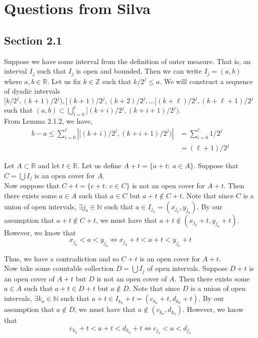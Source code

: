 \documentclass[12pt]{article}
\newenvironment{problem}[2][Problem]{\begin{trivlist}
\item[\hskip \labelsep {\bfseries #1}\hskip \labelsep {\bfseries #2.}]}{\end{trivlist}}
\begin{document}
\section{Questions from Silva}

\subsection{Section 2.1}

\begin{problem}{3}
\end{problem}

Suppose we have some interval from the definition of outer measure. That is, an interval $I_j$ such that $I_j$ is open and bounded. Then we can write $I_j = (a, b)$ where $a, b \in \mathbb{R}$. Let us fix $k \in \mathbb{Z}$ such that $k/2^j \leq a$. We will construct a sequence of dyadic intervals $[k/2^j, (k+1)/2^j), [(k+1)/2^j, (k+2)/2^j, \ldots [(k+\ell)/2^j, (k+\ell+1)/2^j$ such that $(a, b) \subset \bigcup_{i=0}^{\ell}  [(k+i)/2^j, (k+i+1)/2^j)$.\\

From Lemma 2.1.2, we have,
\begin{align*}
b - a \leq \sum_{i=0}^{\ell} |[(k+i)/2^j, (k+i+1)/2^j)| &= \sum_{i=0}^{\ell} 1/2^j\\
&= (\ell + 1)/2^j
\end{align*}

\begin{problem}{4}
\end{problem}

Let $A \subset \mathbb{R}$ and let $t \in \mathbb{R}$. Let us define $A + t = \{a + t: \ a \in A\}$. Suppose that $C = \bigcup I_j$ is an open cover for $A$.\\

Now suppose that $C + t = \{c + t: \ c \in C\}$ is not an open cover for $A + t$. Then there exists some $a \in A$ such that $a \in C$ but $a + t \not\in C + t$. Note that since $C$ is a union of open intervals, $\exists j_a \in \mathbb{N}$ such that $a \in I_{j_a} = (x_{j_a}, y_{j_a})$. By our assumption that $a + t \not\in C + t$, we must have that $a + t \not\in (x_{j_a} + t, y_{j_a} + t)$. However, we know that $$x_{j_a} < a < y_{j_a} \iff x_{j_a} + t < a + t < y_{j_a} + t$$

Thus, we have a contradiction and so $C+t$ is an open cover for $A+t$.\\

Now take some countable collection $D = \bigcup I_j$ of open intervals. Suppose $D + t$ is an open cover of $A + t$ but $D$ is not an open cover of $A$. Then there exists some $a \in A$ such that $a + t \in D + t$ but $a \not\in D$. Note that since $D$ is a union of open intervals, $\exists k_a \in \mathbb{N}$ such that $a + t \in I_{k_a} + t = (c_{k_a} + t, d_{k_a} + t)$. By our assumption that $a \not\in D$, we must have that $a \not\in (c_{k_a}, d_{k_a})$. However, we know that $$c_{k_a} + t < a + t < d_{k_a} + t \iff c_{j_a} < a < d_{j_a}$$
 
\end{document}

